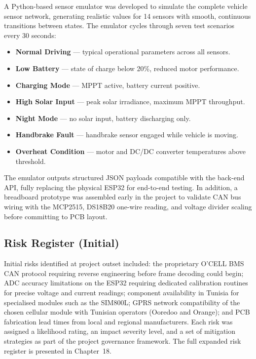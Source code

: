 A Python-based sensor emulator was developed to simulate the complete vehicle sensor network, generating realistic values for 14 sensors with smooth, continuous transitions between states. The emulator cycles through seven test scenarios every 30 seconds:

\begin{itemize}
    \item \textbf{Normal Driving} --- typical operational parameters across all sensors.
    \item \textbf{Low Battery} --- state of charge below 20\%, reduced motor performance.
    \item \textbf{Charging Mode} --- MPPT active, battery current positive.
    \item \textbf{High Solar Input} --- peak solar irradiance, maximum MPPT throughput.
    \item \textbf{Night Mode} --- no solar input, battery discharging only.
    \item \textbf{Handbrake Fault} --- handbrake sensor engaged while vehicle is moving.
    \item \textbf{Overheat Condition} --- motor and DC/DC converter temperatures above threshold.
\end{itemize}

The emulator outputs structured JSON payloads compatible with the back-end API, fully replacing the physical ESP32 for end-to-end testing. In addition, a breadboard prototype was assembled early in the project to validate CAN bus wiring with the MCP2515, DS18B20 one-wire reading, and voltage divider scaling before committing to PCB layout.

\subsection{Risk Register (Initial)}

Initial risks identified at project outset included: the proprietary O'CELL BMS CAN protocol requiring reverse engineering before frame decoding could begin; ADC accuracy limitations on the ESP32 requiring dedicated calibration routines for precise voltage and current readings; component availability in Tunisia for specialised modules such as the SIM800L; GPRS network compatibility of the chosen cellular module with Tunisian operators (Ooredoo and Orange); and PCB fabrication lead times from local and regional manufacturers. Each risk was assigned a likelihood rating, an impact severity level, and a set of mitigation strategies as part of the project governance framework. The full expanded risk register is presented in Chapter~18.

